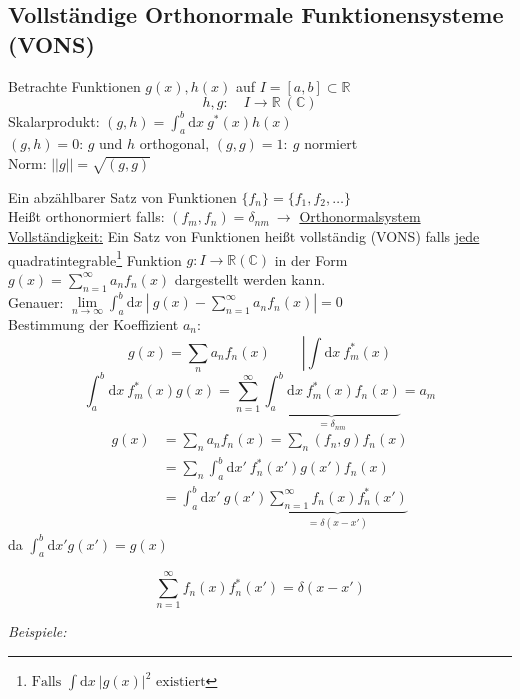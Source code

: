 \documentclass[titlepage,11pt,a4paper,ngerman]{report}
\newcommand{\tx}[1]{\textrm{#1}}
\newcommand{\dd}{\tx{d}}
\newcommand{\summ}[2]{\sum_{#1}^{#2}}
\newcommand{\intt}[2]{\int_{#1}^{#2}}
\newcommand{\frbox}[2]{\begin{tcolorbox}[colback=white,colframe=red!75!black,fonttitle=\bfseries,title=#1]#2\end{tcolorbox}}
\begin{document}
\subsection{Vollständige Orthonormale Funktionensysteme (VONS)}
Betrachte Funktionen $g(x),h(x)$ auf $I = [a,b] \subset \mathbb R$
$$h,g: \quad I \to \mathbb R\ (\mathbb C)$$
Skalarprodukt: $(g,h) = \int_a^b \textrm{d}x\ g^* (x) h(x)$\\
$(g,h) = 0$: $g$ und $h$ orthogonal, $(g,g) = 1:\ g$ normiert\\
Norm: $||g|| = \sqrt{(g,g)}$

\noindent
Ein abzählbarer Satz von Funktionen $\{f_n\} = \{f_1, f_2, \dots \}$\\
Heißt orthonormiert falls: $(f_m,f_n) = \delta_{nm}\ \rightarrow$ \underline{Orthonormalsystem}\\
\underline{Vollständigkeit:} Ein Satz von Funktionen heißt vollständig (VONS) falls \underline{jede} quadratintegrable\footnote{$\textrm{Falls }\int \textrm{d}x\ |g(x)|^2 \textrm{ existiert}$} Funktion $g: I \to \mathbb R (\mathbb C)$ in der Form $g(x) = \summ{n = 1}{\infty} a_n f_n(x)$ dargestellt werden kann.\\
Genauer: $\lim\limits_{n \to \infty} \intt{a}{b} \textrm{d}x\ |\ g(x) - \summ{n = 1}{\infty} a_n f_n(x)| = 0$\\[5pt]
Bestimmung der Koeffizient $ a_n $:
$$g(x) = \sum_n a_n f_n(x)\ \qquad \left| \int \textrm{d}x\ f_m^*(x) \right.$$
$$\intt{a}{b}\textrm{d}x\ f_m^* (x) g(x) = \summ{n = 1}{\infty} \underbrace{\intt{a}{b} \textrm{d}x\ f_m^* (x)f_n(x)}_{= \delta_{nm}} = a_m$$
\begin{align*}
 	g(x) &= \sum_n a_n f_n (x) = \sum_n (f_n,g)f_n(x)\\
 	&= \sum_n \intt{a}{b} \textrm{d}x'\ f_n^* (x') g(x') f_n(x)\\
 	&= \intt{a}{b} \textrm{d}x'\ g(x') \underbrace{\summ{n = 1}{\infty} f_n(x)f_n^*(x')}_{= \delta(x - x')}
\end{align*}
da $ \int_{a}^{b} \dd x' g(x') = g(x) $
\frbox{Vollständigkeitsrelation}{$$\summ{n = 1}{\infty}f_n(x)f_n^*(x') = \delta(x - x')$$}
\noindent
\emph{Beispiele:}
\end{document}
